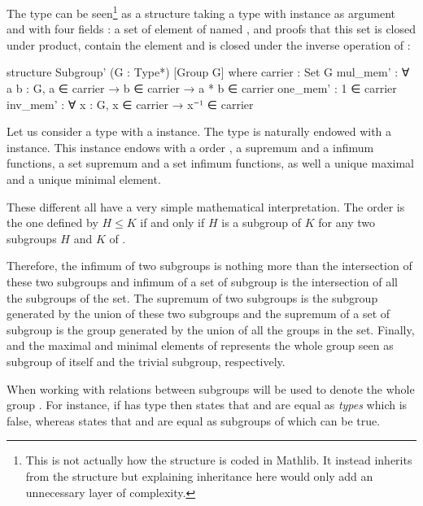 The  type can be seen\footnote{This is not actually how the  structure is coded in Mathlib. It instead inherits from the  structure but explaining inheritance here would only add an unnecessary layer of complexity.} as a structure taking a type  with \lean{[Group G]} instance as argument and with four fields : a set of element of  named , and proofs that this set is closed under product, contain the element  and is closed under the inverse operation of  :

\begin{leancode}
structure Subgroup' (G : Type*) [Group G] where
    carrier : Set G
    mul_mem' : ∀ {a b : G}, a ∈ carrier → b ∈ carrier → a * b ∈ carrier
    one_mem' : 1 ∈ carrier
    inv_mem' : ∀ {x : G}, x ∈ carrier → x⁻¹ ∈ carrier
\end{leancode}

Let us consider a type  with a \lean{[Group G]} instance.
The type  is naturally endowed with a  instance. This instance endows  with a order , a supremum  and a infimum  functions, a set supremum  and a set infimum  functions, as well a unique maximal  and a unique minimal  element.

These different all have a very simple mathematical interpretation. The order is the one defined by $H \le K$ if and only if $H$ is a subgroup of $K$ for any two subgroups $H$ and $K$ of .

Therefore, the infimum of two subgroups is nothing more than the intersection of these two subgroups and infimum of a set of subgroup is the intersection of all the subgroups of the set. The supremum of two subgroups is the subgroup generated by the union of these two subgroups and the supremum of a set of subgroup is the group generated by the union of all the groups in the set. Finally,  and  the maximal and minimal elements of  represents the whole group  seen as subgroup of itself and the trivial subgroup, respectively.

\begin{remarque}
    When working with relations between subgroups  will be used to denote the whole group . For instance, if  has type  then  states that  and  are equal as \emph{types} which is false, whereas  states that  and  are equal as subgroups of  which can be true.
\end{remarque}

